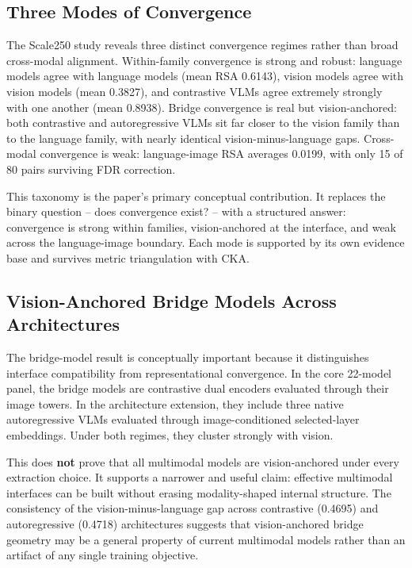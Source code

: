 \documentclass[11pt,a4paper]{article}
\begin{document}
\subsection{Three Modes of
Convergence}\label{three-modes-of-convergence}

The Scale250 study reveals three distinct convergence regimes rather
than broad cross-modal alignment. Within-family convergence is strong
and robust: language models agree with language models (mean RSA
0.6143), vision models agree with vision models (mean 0.3827), and
contrastive VLMs agree extremely strongly with one another (mean
0.8938). Bridge convergence is real but vision-anchored: both
contrastive and autoregressive VLMs sit far closer to the vision family
than to the language family, with nearly identical vision-minus-language
gaps. Cross-modal convergence is weak: language-image RSA averages
0.0199, with only 15 of 80 pairs surviving FDR correction.

This taxonomy is the paper's primary conceptual contribution. It
replaces the binary question -- does convergence exist? -- with a
structured answer: convergence is strong within families,
vision-anchored at the interface, and weak across the language-image
boundary. Each mode is supported by its own evidence base and survives
metric triangulation with CKA.

\subsection{Vision-Anchored Bridge Models Across
Architectures}\label{vision-anchored-bridge-models-across-architectures}

The bridge-model result is conceptually important because it
distinguishes interface compatibility from representational convergence.
In the core 22-model panel, the bridge models are contrastive dual
encoders evaluated through their image towers. In the architecture
extension, they include three native autoregressive VLMs evaluated
through image-conditioned selected-layer embeddings. Under both regimes,
they cluster strongly with vision.

This does \textbf{not} prove that all multimodal models are
vision-anchored under every extraction choice. It supports a narrower
and useful claim: effective multimodal interfaces can be built without
erasing modality-shaped internal structure. The consistency of the
vision-minus-language gap across contrastive (0.4695) and autoregressive
(0.4718) architectures suggests that vision-anchored bridge geometry may
be a general property of current multimodal models rather than an
artifact of any single training objective.
\end{document}
